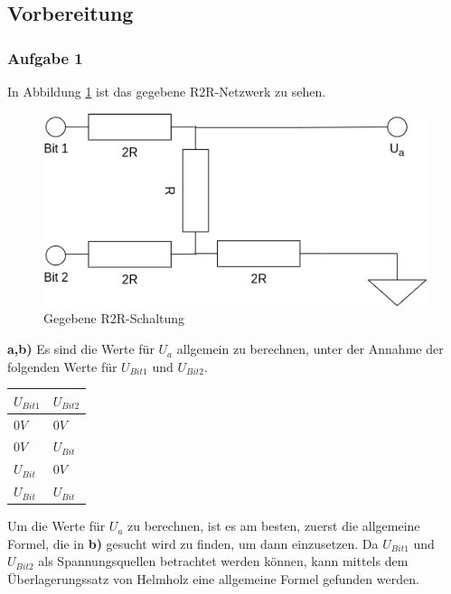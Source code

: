 \newpage

\subsection{Vorbereitung}
\label{subsec:a5-vorbereitung}

\subsubsection{Aufgabe 1}
In Abbildung \ref{fig:gegebene-r2r-schaltung} ist das gegebene R2R-Netzwerk zu sehen.

\begin{figure}
    \centering
    \includegraphics[width=\textwidth]{pictures/a5-1-vorbereitung.png}
    \caption{Gegebene R2R-Schaltung}
    \label{fig:gegebene-r2r-schaltung}
\end{figure}

\textbf{a,b)} Es sind die Werte für $U_a$ allgemein zu berechnen, unter der Annahme der folgenden Werte für $U_{Bit 1}$ und $U_{Bit 2}$.

\begin{tabular}{| l | l |}
    \hline
    $U_{Bit 1}$ & $U_{Bit 2}$ \\
    \hline
    $0V$ & $0V$ \\
    $0V$ & $U_{Bit}$ \\
    $U_{Bit}$ & $0V$ \\
    $U_{Bit}$ & $U_{Bit}$ \\
    \hline
\end{tabular}

Um die Werte für $U_a$ zu berechnen, ist es am besten, zuerst die allgemeine Formel, die in \textbf{b)} gesucht wird zu finden, um dann einzusetzen.
Da $U_{Bit 1}$ und $U_{Bit 2}$ als Spannungsquellen betrachtet werden können, kann mittels dem Überlagerungssatz von Helmholz eine allgemeine Formel gefunden werden.

